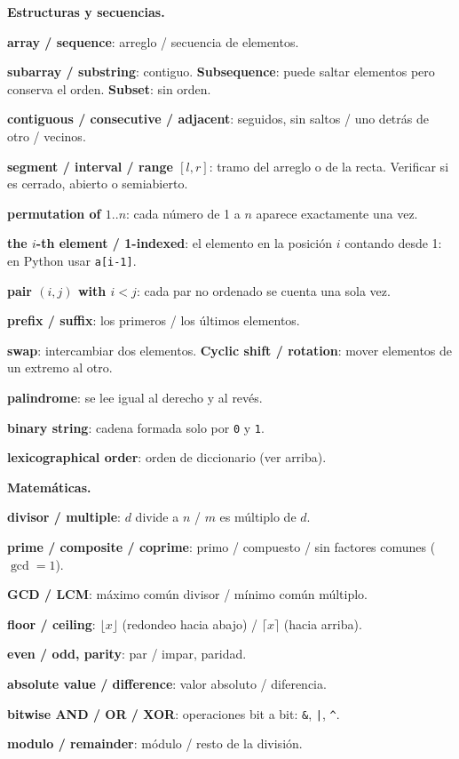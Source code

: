 \textbf{Estructuras y secuencias.}
\begin{props}
  \item \textbf{array / sequence}: arreglo / secuencia de elementos.
  \item \textbf{subarray / substring}: contiguo. \textbf{Subsequence}: puede saltar elementos pero conserva el orden. \textbf{Subset}: sin orden.
  \item \textbf{contiguous / consecutive / adjacent}: seguidos, sin saltos / uno detrás de otro / vecinos.
  \item \textbf{segment / interval / range \([l, r]\)}: tramo del arreglo o de la recta. Verificar si es cerrado, abierto o semiabierto.
  \item \textbf{permutation of \(1..n\)}: cada número de 1 a \(n\) aparece exactamente una vez.
  \item \textbf{the \(i\)-th element / 1-indexed}: el elemento en la posición \(i\) contando desde 1: en Python usar \texttt{a[i-1]}.
  \item \textbf{pair \((i, j)\) with \(i < j\)}: cada par no ordenado se cuenta una sola vez.
  \item \textbf{prefix / suffix}: los primeros / los últimos elementos.
  \item \textbf{swap}: intercambiar dos elementos. \textbf{Cyclic shift / rotation}: mover elementos de un extremo al otro.
  \item \textbf{palindrome}: se lee igual al derecho y al revés.
  \item \textbf{binary string}: cadena formada solo por \texttt{0} y \texttt{1}.
  \item \textbf{lexicographical order}: orden de diccionario (ver arriba).
\end{props}

\textbf{Matemáticas.}
\begin{props}
  \item \textbf{divisor / multiple}: \(d\) divide a \(n\) / \(m\) es múltiplo de \(d\).
  \item \textbf{prime / composite / coprime}: primo / compuesto / sin factores comunes (\(\gcd = 1\)).
  \item \textbf{GCD / LCM}: máximo común divisor / mínimo común múltiplo.
  \item \textbf{floor / ceiling}: \(\lfloor x \rfloor\) (redondeo hacia abajo) / \(\lceil x \rceil\) (hacia arriba).
  \item \textbf{even / odd, parity}: par / impar, paridad.
  \item \textbf{absolute value / difference}: valor absoluto / diferencia.
  \item \textbf{bitwise AND / OR / XOR}: operaciones bit a bit: \texttt{\&}, \texttt{|}, \texttt{\textasciicircum{}}.
  \item \textbf{modulo / remainder}: módulo / resto de la división.
\end{props}
